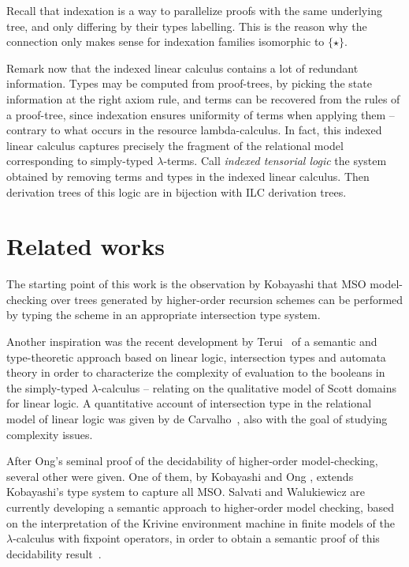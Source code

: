 \documentclass{eptcs}
\begin{document}
Recall that indexation is a way to parallelize proofs with the same underlying tree, and only differing by their types labelling. This is the reason why the connection only makes sense for indexation families isomorphic to $\{\star \}$.

Remark now that the indexed linear calculus contains a lot of redundant information. Types may be computed from proof-trees, by picking the state information at the right axiom rule, and terms can be recovered from the rules of a proof-tree, since indexation ensures uniformity of terms when applying them -- contrary to what occurs in the resource lambda-calculus. In fact, this indexed linear calculus captures precisely the fragment of the relational model corresponding to simply-typed $\lambda$-terms. Call \emph{indexed tensorial logic} the system obtained by removing terms and types in the indexed linear calculus. Then derivation trees of this logic are in bijection with ILC derivation trees.



\section{Related works}\label{section/related-works}
The starting point of this work is the observation by Kobayashi \cite{koba09} that MSO model-checking over trees generated by higher-order recursion schemes can be performed by typing the scheme in an appropriate intersection type system.

Another inspiration was the recent development by Terui~\cite{terui} of a semantic and type-theoretic approach 
based on linear logic, intersection types and automata theory
in order to characterize the complexity of evaluation to the booleans
in the simply-typed $\lambda$-calculus -- relating on the qualitative model of Scott domains for linear logic. A quantitative account of intersection type in the relational model of linear logic was given by de Carvalho~\cite{carvalho}, also with the goal of studying complexity issues.

After Ong's seminal proof \cite{ong} of the decidability of higher-order model-checking, several other were given. One of them, by Kobayashi and Ong \cite{kobayashi-ong}, extends Kobayashi's type system to capture all MSO. Salvati and Walukiewicz are currently developing
a semantic approach to higher-order model checking, based on the interpretation
of the Krivine environment machine in finite models of the $\lambda$-calculus 
with fixpoint operators, in order to obtain a semantic proof of this decidability result~\cite{salvati,salvati2}.
\end{document}
